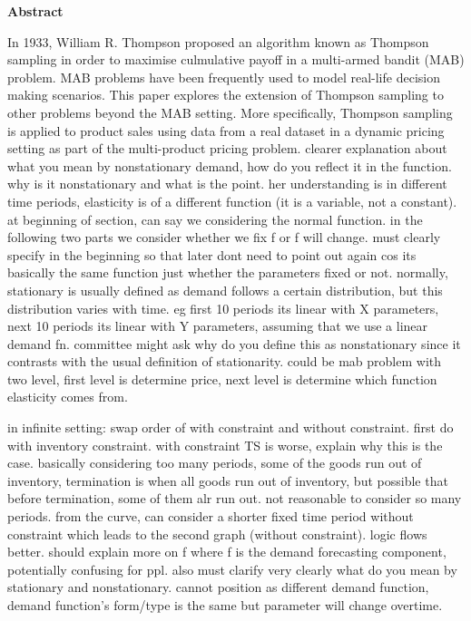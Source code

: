 \documentclass[a4paper]{article}
\begin{document}
\pagebreak
\begin{center}
	\large
	\textbf{Abstract}
	\vspace{1cm}
\end{center}	
	\large
	In 1933, William R. Thompson proposed an algorithm known as Thompson sampling in order to maximise culmulative payoff in a multi-armed bandit (MAB) problem. MAB problems have been frequently used to model real-life decision making scenarios. This paper explores the extension of Thompson sampling to other problems beyond the MAB setting. More specifically, Thompson sampling is applied to product sales using data from a real dataset in a dynamic pricing setting as part of the multi-product pricing problem. 
	\newpage
	clearer explanation about what you mean by nonstationary demand, how do you reflect it in the function. why is it nonstationary and what is the point. her understanding is in different time periods, elasticity is of a different function (it is a variable, not a constant). at beginning of section, can say we considering the normal function. in the following two parts we consider whether we fix f or f will change. must clearly specify in the beginning so that later dont need to point out again cos its basically the same function just whether the parameters fixed or not. 
	normally, stationary is usually defined as demand follows a certain distribution, but this distribution varies with time. eg first 10 periods its linear with X parameters, next 10 periods its linear with Y parameters, assuming that we use a linear demand fn. committee might ask why do you define this as nonstationary since it contrasts with the usual definition of stationarity. could be mab problem with two level, first level is determine price, next level is determine which function elasticity comes from. 
	
	in infinite setting: swap order of with constraint and without constraint. first do with inventory constraint. with constraint TS is worse, explain why this is the case. basically considering too many periods, some of the goods run out of inventory, termination is when all goods run out of inventory, but possible that before termination, some of them alr run out. not reasonable to consider so many periods. from the curve, can consider a shorter fixed time period without constraint which leads to the second graph (without constraint). logic flows better. should explain more on f where f is the demand forecasting component, potentially confusing for ppl. also must clarify very clearly what do you mean by stationary and nonstationary. cannot position as different demand function, demand function's form/type is the same but parameter will change overtime. 
	
\end{document}

